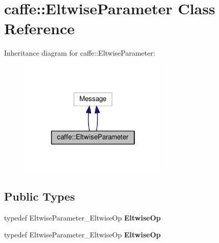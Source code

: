 \hypertarget{classcaffe_1_1_eltwise_parameter}{}\section{caffe\+:\+:Eltwise\+Parameter Class Reference}
\label{classcaffe_1_1_eltwise_parameter}


Inheritance diagram for caffe\+:\+:Eltwise\+Parameter\+:
\nopagebreak
\begin{figure}[H]
\begin{center}
\leavevmode
\includegraphics[width=202pt]{classcaffe_1_1_eltwise_parameter__inherit__graph}
\end{center}
\end{figure}
\subsection*{Public Types}
\begin{DoxyCompactItemize}
\item 
\mbox{\label{classcaffe_1_1_eltwise_parameter_af76cfda81a5c16ba2e8db91296eff912}} 
typedef Eltwise\+Parameter\+\_\+\+Eltwise\+Op {\bfseries Eltwise\+Op}
\item 
\mbox{\label{classcaffe_1_1_eltwise_parameter_af76cfda81a5c16ba2e8db91296eff912}} 
typedef Eltwise\+Parameter\+\_\+\+Eltwise\+Op {\bfseries Eltwise\+Op}
\end{DoxyCompactItemize}
